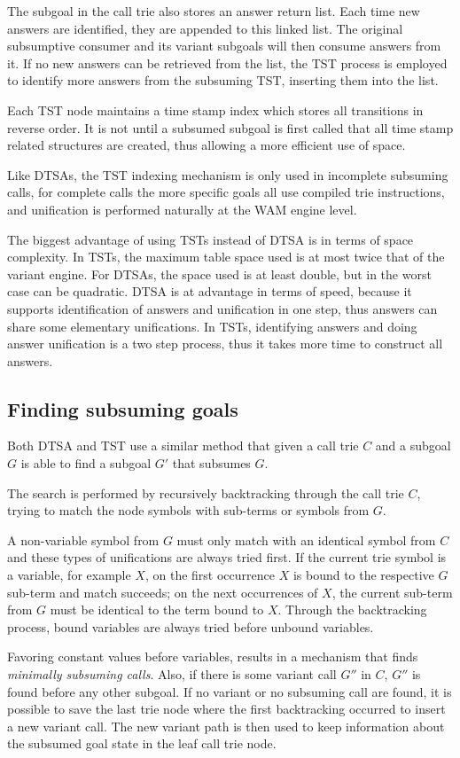   The subgoal in the call trie also stores an answer return list. Each time new answers are identified, they are appended
  to this linked list. The original subsumptive consumer and its variant subgoals will then consume answers from it. If no
  new answers can be retrieved from the list, the TST process is employed to identify more answers from the subsuming TST,
  inserting them into the list.
  
  Each TST node maintains a time stamp index which stores all transitions in reverse order.
  It is not until a subsumed subgoal is first called that all time stamp related structures are created, thus
  allowing a more efficient use of space.
  
  Like DTSAs, the TST indexing mechanism is only used in incomplete subsuming calls, for complete calls
  the more specific goals all use compiled trie instructions, and unification is performed naturally at
  the WAM engine level.
  
  The biggest advantage of using TSTs instead of DTSA is in terms of space complexity. In TSTs, the maximum table space
  used is at most twice that of the variant engine. For DTSAs, the space used is at least double, but in the worst
  case can be quadratic. DTSA is at advantage in terms of speed, because it supports identification of answers and
  unification in one step, thus answers can share some elementary unifications. In TSTs, identifying answers
  and doing answer unification is a two step process, thus it takes more time to construct all answers. 

\subsection{Finding subsuming goals}

Both DTSA and TST use a similar method that given a call trie $C$ and a subgoal $G$
is able to find a subgoal $G'$ that subsumes $G$.

The search is performed by recursively backtracking through the call trie $C$, trying
to match the node symbols with sub-terms or symbols from $G$.

A non-variable symbol from $G$ must only match with an identical symbol from $C$ and
these types of unifications are always tried first.
If the current trie symbol is a variable, for example $X$, on the first occurrence $X$
is bound to the respective $G$ sub-term
and match succeeds; on the next occurrences of $X$, the current sub-term from $G$ must
be identical to the term bound to $X$. Through the backtracking process, bound variables are
always tried before unbound variables.

Favoring constant values before variables, results in a mechanism that finds \textit{minimally subsuming calls}.
Also, if there is some variant call $G''$ in $C$, $G''$ is found before any other subgoal. If no variant 
or no subsuming call are found, it is possible to save the last trie node where the first backtracking occurred
to insert a new variant call. The new variant path is then used to keep information about the subsumed goal state in
the leaf call trie node.

